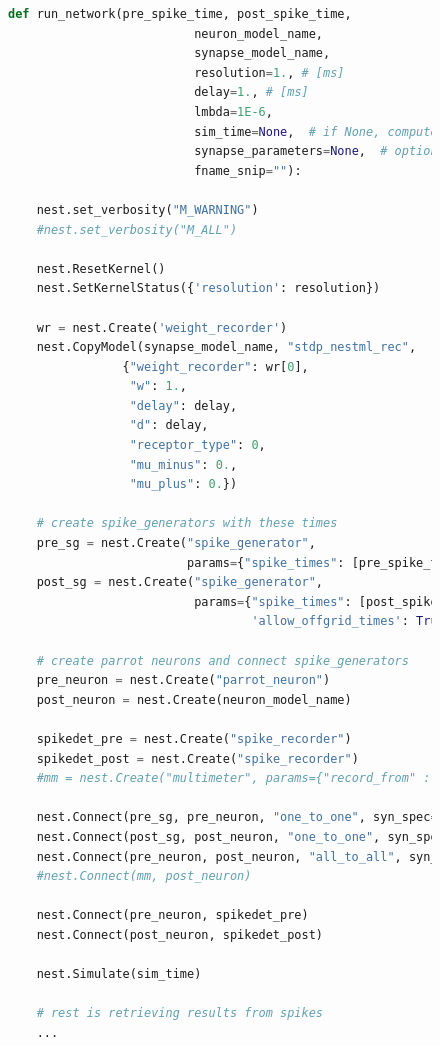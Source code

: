 \begin{figure}[ht!]
\centering
\begin{lstlisting}[language=Python, label=lst:build_network_without_jit, caption={Creating the network without \emph{JIT}}]
def run_network(pre_spike_time, post_spike_time,
                          neuron_model_name,
                          synapse_model_name,
                          resolution=1., # [ms]
                          delay=1., # [ms]
                          lmbda=1E-6,
                          sim_time=None,  # if None, computed from pre and post spike times
                          synapse_parameters=None,  # optional dictionary passed to the synapse
                          fname_snip=""):

    nest.set_verbosity("M_WARNING")
    #nest.set_verbosity("M_ALL")

    nest.ResetKernel()
    nest.SetKernelStatus({'resolution': resolution})

    wr = nest.Create('weight_recorder')
    nest.CopyModel(synapse_model_name, "stdp_nestml_rec",
                {"weight_recorder": wr[0],
                 "w": 1.,
                 "delay": delay,
                 "d": delay,
                 "receptor_type": 0,
                 "mu_minus": 0.,
                 "mu_plus": 0.})

    # create spike_generators with these times
    pre_sg = nest.Create("spike_generator",
                         params={"spike_times": [pre_spike_time, sim_time - 10.]})
    post_sg = nest.Create("spike_generator",
                          params={"spike_times": [post_spike_time],
                                  'allow_offgrid_times': True})

    # create parrot neurons and connect spike_generators
    pre_neuron = nest.Create("parrot_neuron")
    post_neuron = nest.Create(neuron_model_name)

    spikedet_pre = nest.Create("spike_recorder")
    spikedet_post = nest.Create("spike_recorder")
    #mm = nest.Create("multimeter", params={"record_from" : ["V_m"]})

    nest.Connect(pre_sg, pre_neuron, "one_to_one", syn_spec={"delay": 1.})
    nest.Connect(post_sg, post_neuron, "one_to_one", syn_spec={"delay": 1., "weight": 9999.})
    nest.Connect(pre_neuron, post_neuron, "all_to_all", syn_spec={'synapse_model': 'stdp_nestml_rec'})
    #nest.Connect(mm, post_neuron)

    nest.Connect(pre_neuron, spikedet_pre)
    nest.Connect(post_neuron, spikedet_post)
    
    nest.Simulate(sim_time)
    
    # rest is retrieving results from spikes
    ...

\end{lstlisting}
\end{figure}

